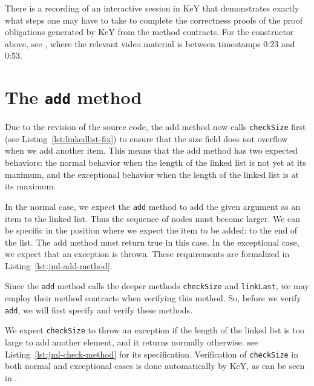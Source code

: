\documentclass[runningheads]{llncs}
\begin{document}


There is a recording of an interactive session in KeY that demonstrates exactly what steps one may have to take to complete the correctness proofs of the proof obligations generated by KeY from the method contracts. For the constructor above, see \cite[0:23--0:53]{Bian2019addbranch}, where the relevant video material is between timestamps 0:23 and 0:53.

\section{The \texttt{add} method}\label{sec:add}

Due to the revision of the source code, the add method now calls \texttt{checkSize} first (see Listing~\ref{lst:linkedlist-fix}) to ensure that the size field does not overflow when we add another item. This means that the add method has two expected behaviors: the normal behavior when the length of the linked list is not yet at its maximum, and the exceptional behavior when the length of the linked list is at its maximum.

In the normal case, we expect the \texttt{add} method to add the given argument as an item to the linked list. Thus the sequence of nodes must become larger. We can be specific in the position where we expect the item to be added: to the end of the list. The add method must return true in this case. In the exceptional case, we expect that an exception is thrown. These requirements are formalized in Listing~\ref{lst:jml-add-method}.



Since the \texttt{add} method calls the deeper methods \texttt{checkSize} and \texttt{linkLast}, we may employ their method contracts when verifying this method. So, before we verify \texttt{add}, we will first specify and verify these methods.

We expect \texttt{checkSize} to throw an exception if the length of the linked list is too large to add another element, and it returns normally otherwise: see Listing~\ref{lst:jml-check-method} for its specification. Verification of \texttt{checkSize} in both normal and exceptional cases is done automatically by KeY, as can be seen in \cite[0:54--1:24]{Bian2019addbranch}.
\end{document}
